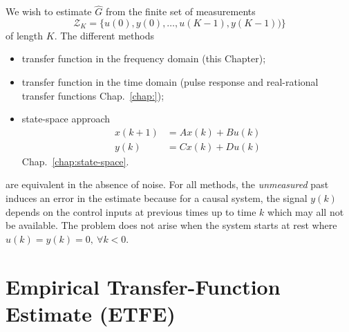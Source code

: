 We wish to estimate $\hat{G}$ from the finite set of measurements
\begin{equation*}
  \mathcal{Z}_K = \{u(0),y(0),\ldots,u(K-1),y(K-1))\}
\end{equation*}
of length $K$. The different methods
\begin{itemize}
\item transfer function in the frequency domain (this Chapter);
\item transfer function in the time domain (pulse response and real-rational transfer functions Chap.~\ref{chap:});
\item state-space approach
  \begin{equation*}
    \begin{aligned}
      x(k+1) &= Ax(k) + Bu(k) \\
      y(k) &= Cx(k) + Du(k)
    \end{aligned}
  \end{equation*}
  Chap.~\ref{chap:state-space}.
\end{itemize}
are equivalent in the absence of noise. For all methods, the \emph{unmeasured} past induces an error in the estimate because for a causal system, the signal $y(k)$ depends on the control inputs at previous times up to time $k$ which may all not be available. The problem does not arise when the system starts at rest where $u(k)=y(k)=0,\ \forall k<0$.

\section{Empirical Transfer-Function Estimate (ETFE)}
\label{sec:ETFE}

